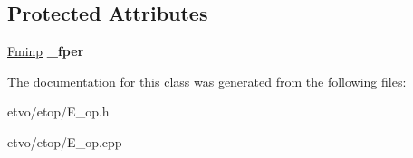 \subsection*{Protected Attributes}
\begin{DoxyCompactItemize}
\item 
\mbox{\label{classetvo_i_i_1_1_e__op_a91391e58b0727cc20cd963746efb0884}} 
\mbox{\hyperlink{classetvo_i_i_1_1_fminp}{Fminp}} {\bfseries \+\_\+fper}
\end{DoxyCompactItemize}


The documentation for this class was generated from the following files\+:\begin{DoxyCompactItemize}
\item 
etvo/etop/E\+\_\+op.\+h\item 
etvo/etop/E\+\_\+op.\+cpp\end{DoxyCompactItemize}
